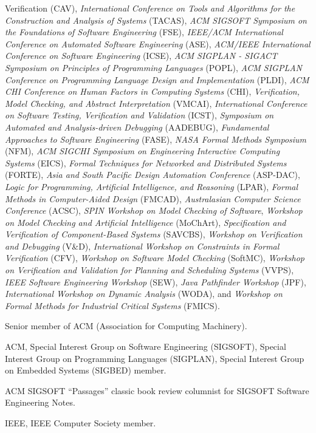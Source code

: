 \documentclass[ComputerScience]{vita}
\begin{document}
\begin{vita}
\begin{Professional Activities and Service}
{  Verification} (CAV), \emph{International Conference on Tools and Algorithms for the Construction and Analysis of Systems} (TACAS), \emph{ACM SIGSOFT Symposium on the Foundations of Software Engineering} (FSE), \emph{IEEE/ACM International Conference on Automated Software Engineering} (ASE), \emph{ACM/IEEE International Conference on Software Engineering} (ICSE), \emph{ACM SIGPLAN - SIGACT Symposium on Principles of Programming Languages} (POPL), \emph{ACM SIGPLAN Conference on Programming Language Design and Implementation} (PLDI), \emph{ACM CHI Conference on Human Factors in Computing Systems} (CHI), \emph{Verification, Model Checking, and Abstract Interpretation} (VMCAI), \emph{International Conference on Software Testing, Verification and Validation} (ICST), \emph{Symposium on Automated and Analysis-driven Debugging} (AADEBUG), \emph{Fundamental Approaches to Software Engineering} (FASE), \emph{NASA Formal Methods Symposium} (NFM), \emph{ACM SIGCHI Symposium on Engineering Interactive Computing Systems} (EICS), \emph{Formal Techniques for Networked and Distributed Systems} (FORTE), \emph{Asia and South Pacific Design Automation Conference} (ASP-DAC), \emph{Logic for Programming, Artificial Intelligence, and Reasoning} (LPAR), \emph{Formal Methods in Computer-Aided Design} (FMCAD), \emph{Australasian Computer Science Conference} (ACSC), \emph{SPIN Workshop on Model Checking of Software}, \emph{Workshop on Model Checking and Artificial Intelligence} (MoChArt), \emph{Specification and Verification of Component-Based Systems} (SAVCBS), \emph{Workshop on Verification and Debugging} (V\&D), \emph{International Workshop on Constraints in Formal Verification} (CFV), \emph{Workshop on Software Model Checking} (SoftMC), \emph{Workshop on Verification and Validation for Planning and Scheduling Systems} (VVPS), \emph{IEEE Software Engineering Workshop} (SEW), \emph{Java Pathfinder Workshop} (JPF), \emph{International Workshop on Dynamic Analysis} (WODA), and \emph{Workshop on Formal Methods for Industrial Critical Systems} (FMICS).
\item Senior member of ACM (Association for Computing Machinery).
  \item ACM, Special Interest Group on Software Engineering (SIGSOFT),
    Special Interest Group on Programming Languages (SIGPLAN), Special
    Interest Group on Embedded Systems (SIGBED) member.
\item ACM SIGSOFT ``Passages'' classic book review columnist for SIGSOFT Software Engineering Notes.
\item IEEE, IEEE Computer Society member.

\end{Professional Activities and Service}
\end{vita}
\end{document}
